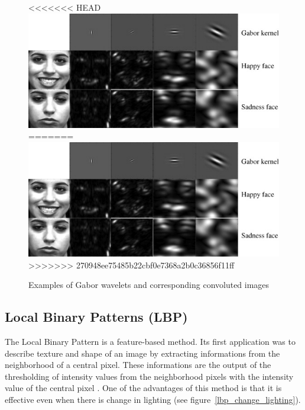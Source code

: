 \begin{figure}[!h]
\begin{center}
<<<<<<< HEAD
\noindent \includegraphics[scale=0.8]{figures/gabor_wavelets_example} 
=======
\noindent \includegraphics[scale=1]{figures/gabor_wavelets_example} 
>>>>>>> 270948ee75485b22cbf0e7368a2b0c36856f11ff
\newline
\caption{Examples of Gabor wavelets and corresponding convoluted images}
\label{gabor_wavelets_example}
\end{center} 
\end{figure}

\subsection{Local Binary Patterns (LBP)}

\vspace{\baselineskip}
\noindent The Local Binary Pattern is a feature-based method. Its first application was to describe texture and shape of an image by extracting informations from the neighborhood of a central pixel. These informations are the output of the thresholding of intensity values from the neighborhood pixels with the intensity value of the central pixel \cite{GAN08}. One of the advantages of this method is that it is effective even when there is change in lighting (see figure~\ref{lbp_change_lighting}).
\newline

